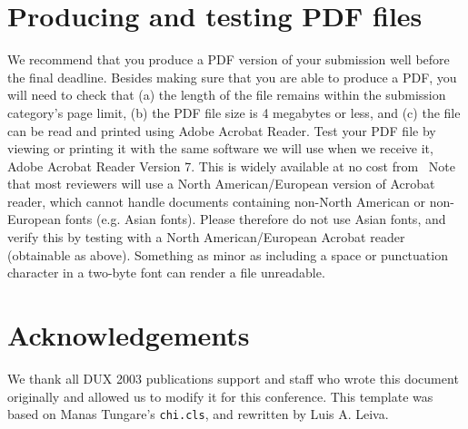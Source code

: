 \documentclass{chi-ext}
\begin{document}
\section{Producing and testing PDF files}
We recommend that you produce a PDF version of your submission well before the final deadline. 
Besides making sure that you are able to produce a PDF, you will need to check that (a) the length of the file remains within the submission category's page limit, (b) the PDF file size is 4 megabytes or less, and (c) the file can be read and printed using Adobe Acrobat Reader. 
Test your PDF file by viewing or printing it with the same software we will use when we receive it, Adobe Acrobat Reader Version 7. 
This is widely available at no cost from~%
Note that most reviewers will use a North American/European version of Acrobat reader, which cannot handle documents containing non-North American or non-European fonts (e.g. Asian fonts).  
Please therefore do not use Asian fonts, and verify this by testing with a North American/European Acrobat reader (obtainable as above). Something as minor as including a space or punctuation character in a two-byte font can render a file unreadable.

\section{Acknowledgements}
We thank all DUX 2003 publications support and staff who wrote this document originally and allowed us to modify it for this conference.
This template was based on Manas Tungare's \texttt{chi.cls}, and rewritten by Luis A. Leiva.

\balance



\end{document}
